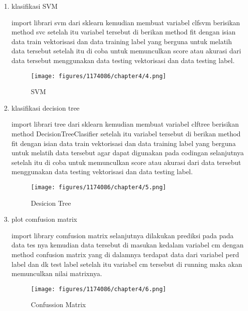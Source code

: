 \begin{enumerate}
        \item klasifikasi SVM \hfill \break 
        
        import librari svm dari sklearn kemudian membuat variabel clfsvm berisikan method svc setelah itu variabel tersebut di berikan method fit dengan isian data train vektorisasi dan data training label yang berguna untuk melatih data tersebut setelah itu di coba untuk memunculkan score atau akurasi dari data tersebut menggunakan data testing vektorisasi dan data testing label.
        \begin{figure}[H]
            \texttt{[image: figures/1174086/chapter4/4.png]}
            \centering
            \caption{SVM}
        \end{figure}

        \item klasifikasi decision tree \hfill \break 
        
        import librari tree dari sklearn kemudian membuat variabel clftree berisikan method DecisionTreeClasifier setelah itu variabel tersebut di berikan method fit dengan isian data train vektorisasi dan data training label yang berguna untuk melatih data tersebut agar dapat digunakan pada codingan selanjutnya setelah itu di coba untuk memunculkan score atau akurasi dari data tersebut menggunakan data testing vektorisasi dan data testing label.
        \begin{figure}[H]
            \texttt{[image: figures/1174086/chapter4/5.png]}
            \centering
            \caption{Desicion Tree}
        \end{figure}

        \item plot comfusion matrix \hfill \break 
        
        import library comfusion matrix selanjutnya dilakukan prediksi pada pada data tes nya kemudian data tersebut di masukan kedalam variabel cm dengan method confusion matrix yang di dalamnya terdapat data dari variabel perd label dan dk test label setelah itu variabel cm tersebut di running maka akan memunculkan nilai matrixnya. 
        \begin{figure}[H]
            \texttt{[image: figures/1174086/chapter4/6.png]}
            \centering
            \caption{Confussion Matrix}
        \end{figure}


\end{enumerate}
